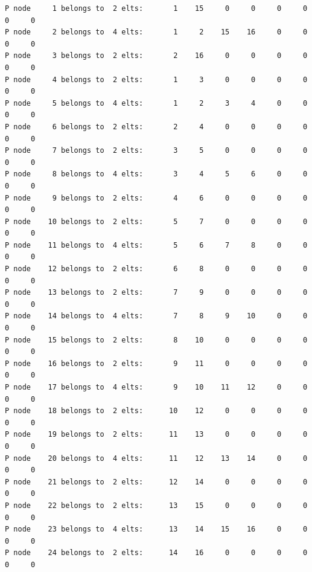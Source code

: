 \begin{small}
\begin{verbatim}
P node     1 belongs to  2 elts:       1    15     0     0     0     0     0     0
P node     2 belongs to  4 elts:       1     2    15    16     0     0     0     0
P node     3 belongs to  2 elts:       2    16     0     0     0     0     0     0
P node     4 belongs to  2 elts:       1     3     0     0     0     0     0     0
P node     5 belongs to  4 elts:       1     2     3     4     0     0     0     0
P node     6 belongs to  2 elts:       2     4     0     0     0     0     0     0
P node     7 belongs to  2 elts:       3     5     0     0     0     0     0     0
P node     8 belongs to  4 elts:       3     4     5     6     0     0     0     0
P node     9 belongs to  2 elts:       4     6     0     0     0     0     0     0
P node    10 belongs to  2 elts:       5     7     0     0     0     0     0     0
P node    11 belongs to  4 elts:       5     6     7     8     0     0     0     0
P node    12 belongs to  2 elts:       6     8     0     0     0     0     0     0
P node    13 belongs to  2 elts:       7     9     0     0     0     0     0     0
P node    14 belongs to  4 elts:       7     8     9    10     0     0     0     0
P node    15 belongs to  2 elts:       8    10     0     0     0     0     0     0
P node    16 belongs to  2 elts:       9    11     0     0     0     0     0     0
P node    17 belongs to  4 elts:       9    10    11    12     0     0     0     0
P node    18 belongs to  2 elts:      10    12     0     0     0     0     0     0
P node    19 belongs to  2 elts:      11    13     0     0     0     0     0     0
P node    20 belongs to  4 elts:      11    12    13    14     0     0     0     0
P node    21 belongs to  2 elts:      12    14     0     0     0     0     0     0
P node    22 belongs to  2 elts:      13    15     0     0     0     0     0     0
P node    23 belongs to  4 elts:      13    14    15    16     0     0     0     0
P node    24 belongs to  2 elts:      14    16     0     0     0     0     0     0
\end{verbatim}
\end{small}














\newpage
